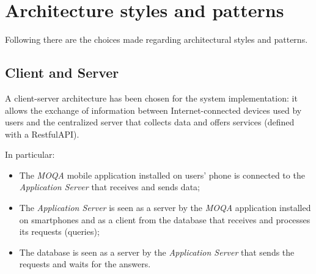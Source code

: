 \section{Architecture styles and patterns}
Following there are the choices made regarding architectural styles and patterns.

\subsection{Client and Server}
A client-server architecture has been chosen for the system implementation: it allows the exchange of information between Internet-connected devices used by users and the centralized server that collects data and offers services (defined with a RestfulAPI).

In particular:
\begin{itemize}
  \item The \textit{MOQA} mobile application installed on users' phone is connected to the \textit{Application Server} that receives and sends data;
  \item The \textit{Application Server} is seen as a server by the \textit{MOQA} application installed on smartphones and as a client from the database that receives and processes its requests (queries);
  \item The database is seen as a server by the \textit{Application Server} that sends the requests and waits for the answers.
\end{itemize}

